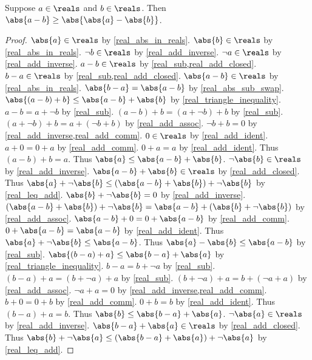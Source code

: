 \begin{theorem}\label{real_reverse_triangle_inequality}
    Suppose $a\in\reals$ and $b\in\reals$.
    Then $\abs{a - b} \geq \abs{\abs{a} - \abs{b}}$.
\end{theorem}
\begin{proof}
    $\abs{a}\in\reals$ by \cref{real_abs_in_reals}.
    $\abs{b}\in\reals$ by \cref{real_abs_in_reals}.
    $\neg{b}\in\reals$ by \cref{real_add_inverse}.
    $\neg{a}\in\reals$ by \cref{real_add_inverse}.
    $a - b\in\reals$ by \cref{real_sub,real_add_closed}.
    $b - a\in\reals$ by \cref{real_sub,real_add_closed}.
    $\abs{a - b}\in\reals$ by \cref{real_abs_in_reals}.
    $\abs{b - a} = \abs{a - b}$ by \cref{real_abs_sub_swap}.
    $\abs{(a - b) + b} \leq \abs{a - b} + \abs{b}$ by \cref{real_triangle_inequality}.
    $a - b = a + \neg{b}$ by \cref{real_sub}.
    $(a - b) + b = (a + \neg{b}) + b$ by \cref{real_sub}.
    $(a + \neg{b}) + b = a + (\neg{b} + b)$ by \cref{real_add_assoc}.
    $\neg{b} + b = 0$ by \cref{real_add_inverse,real_add_comm}.
    $0\in\reals$ by \cref{real_add_ident}.
    $a + 0 = 0 + a$ by \cref{real_add_comm}.
    $0 + a = a$ by \cref{real_add_ident}.
    Thus $(a - b) + b = a$.
    Thus $\abs{a} \leq \abs{a - b} + \abs{b}$.
    $\neg{\abs{b}}\in\reals$ by \cref{real_add_inverse}.
    $\abs{a - b} + \abs{b}\in\reals$ by \cref{real_add_closed}.
    Thus $\abs{a} + \neg{\abs{b}} \leq (\abs{a - b} + \abs{b}) + \neg{\abs{b}}$ by \cref{real_leq_add}.
    $\abs{b} + \neg{\abs{b}} = 0$ by \cref{real_add_inverse}.
    $(\abs{a - b} + \abs{b}) + \neg{\abs{b}} = \abs{a - b} + (\abs{b} + \neg{\abs{b}})$ by \cref{real_add_assoc}.
    $\abs{a - b} + 0 = 0 + \abs{a - b}$ by \cref{real_add_comm}.
    $0 + \abs{a - b} = \abs{a - b}$ by \cref{real_add_ident}.
    Thus $\abs{a} + \neg{\abs{b}} \leq \abs{a - b}$.
    Thus $\abs{a} - \abs{b} \leq \abs{a - b}$ by \cref{real_sub}.
    $\abs{(b - a) + a} \leq \abs{b - a} + \abs{a}$ by \cref{real_triangle_inequality}.
    $b - a = b + \neg{a}$ by \cref{real_sub}.
    $(b - a) + a = (b + \neg{a}) + a$ by \cref{real_sub}.
    $(b + \neg{a}) + a = b + (\neg{a} + a)$ by \cref{real_add_assoc}.
    $\neg{a} + a = 0$ by \cref{real_add_inverse,real_add_comm}.
    $b + 0 = 0 + b$ by \cref{real_add_comm}.
    $0 + b = b$ by \cref{real_add_ident}.
    Thus $(b - a) + a = b$.
    Thus $\abs{b} \leq \abs{b - a} + \abs{a}$.
    $\neg{\abs{a}}\in\reals$ by \cref{real_add_inverse}.
    $\abs{b - a} + \abs{a}\in\reals$ by \cref{real_add_closed}.
    Thus $\abs{b} + \neg{\abs{a}} \leq (\abs{b - a} + \abs{a}) + \neg{\abs{a}}$ by \cref{real_leq_add}.

\end{proof}
